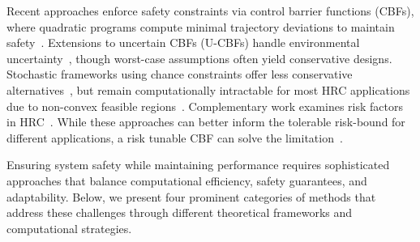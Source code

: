 \documentclass[Afour,sageh,times]{template/sagej}
\begin{document}
Recent approaches enforce safety constraints via control barrier functions (CBFs), where quadratic programs compute minimal trajectory deviations to maintain safety~\cite{hsu2023safety,ferraguti2020safety,dai2023safe}. Extensions to uncertain CBFs (U-CBFs) handle environmental uncertainty~\cite{das2024robust,li2023robust}, though worst-case assumptions often yield conservative designs. Stochastic frameworks using chance constraints offer less conservative alternatives~\cite{wang2024flow,du2011probabilistic}, but remain computationally intractable for most HRC applications due to non-convex feasible regions~\cite{ahmed2008solving}. Complementary work examines risk factors in HRC~\cite{berx2022identification,inam2018risk,liu2020dynamic,majumdar2020should}. While these approaches can better inform the tolerable risk-bound for different applications, a risk tunable CBF can solve the limitation~\cite{11023035}. 

Ensuring system safety while maintaining performance requires sophisticated approaches that balance computational efficiency, safety guarantees, and adaptability. Below, we present four prominent categories of methods that address these challenges through different theoretical frameworks and computational strategies.

\end{document}
